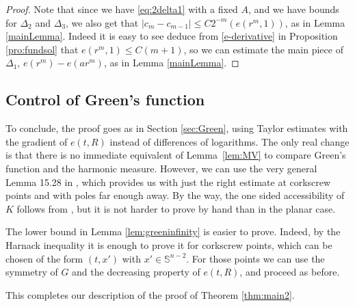 \documentclass[10pt]{amsart}
\numberwithin{equation}{section}
\theoremstyle{plain}
\theoremstyle{definition}
\begin{document}
\begin{proof}
Note that since we have \eqref{eq:2delta1} with a fixed $A$, and we have bounds for $\Delta_2$ and $\Delta_3$,
we also get that $|c_m-c_{m-1}| \leq C 2^{-m} (e(r^m,1))$, as in Lemma \ref{mainLemma}. Indeed it is easy to see deduce
from \ref{e-derivative} in Proposition \ref{pro:fundsol} that $e(r^m,1) \leq C (m+1)$, so we can estimate the main piece of
$\Delta_1$, \ie $e(r^m)-e(ar^m)$, as in Lemma \ref{mainLemma}.
\end{proof}

\subsection{Control of Green's function}

To conclude, the proof goes as in Section \ref{sec:Green}, using Taylor estimates with the gradient of $e(t,R)$ instead of differences of logarithms. The only real change is that there is no immediate equivalent of Lemma~\ref{lem:MV} to compare Green's function and the harmonic measure.
However, we can use the very general Lemma 15.28 in \cite{DFM-Mixed}, which provides us with just the right estimate at corkscrew points and with poles far enough away. By the way, the one sided accessibility of $K$ follows from \cite[Lem.\,2.2]{DFM-Memoirs}, but it is not harder to prove by hand than in the planar case.

The lower bound in Lemma \ref{lem:greeninfinity} is easier to prove. Indeed, by the Harnack inequality it is enough to
prove it for corkscrew points, which can be chosen of the form $(t,x')$ with $x' \in \mathbb{S}^{n-2}$.
For those points we can use the symmetry of $G$ and the decreasing property of $e(t,R)$, and proceed as before.

This completes our description of the proof of Theorem \ref{thm:main2}.
\end{document}
